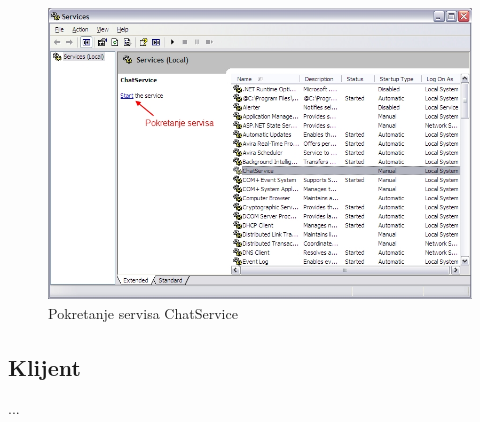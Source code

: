 \documentclass[10pt,a4paper,onecolumn,titlepage]{article}
\begin{document}
\begin{figure}[!ht]
\begin{minipage}{\textwidth}
\centering
\includegraphics[width=\textwidth]{images/start_service.jpg}
\caption{Pokretanje servisa ChatService}
\end{minipage}
\end{figure}

\subsection{Klijent}

...
\end{document}
